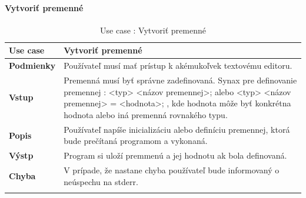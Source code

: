 \paragraph{Vytvoriť premenné}
\begin{center}
	\begin{longtable}{|p{2.5cm}|p{14cm}|}
		
			\hline
			\textbf{Use case} & Vytvoriť premenné \\ 
			\hline
			\textbf{Podmienky} & Používateľ musí mať prístup k akémukoľvek textovému editoru.  \\ 
			\hline
			\textbf{Vstup} & Premenná musí byť správne zadefinovaná. 
			\newline
			Synax pre definovanie premennej : 
			\newline
			<typ> <názov premennej>; alebo 
			\newline
			 <typ> <názov premennej> = <hodnota>;
			 \newline
			 , kde hodnota môže byť konkrétna hodnota alebo iná premenná rovnakého typu.\\
			\hline
			\textbf{Popis} & Používateľ napíše inicializáciu alebo definíciu premennej, ktorá bude prečítaná programom a vykonaná.\\ 
			\hline
			\textbf{Výstp} & Program si uloží premmenú a jej hodnotu ak bola definovaná.\\
			\hline
			\textbf{Chyba} & V prípade, že nastane chyba používateľ bude informovaný o neúspechu na stderr.\\
			\hline
			\caption{Use case : Vytvoriť premenné}
		\label{table:1}
	
	\end{longtable}
\end{center}
